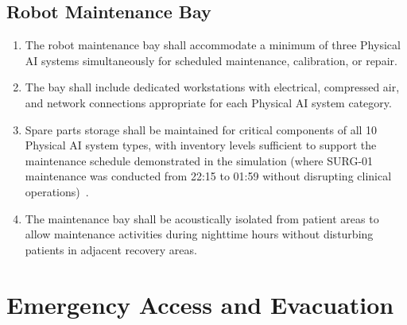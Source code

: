 \documentclass[11pt,letterpaper]{article}
\begin{document}
\subsection{Robot Maintenance Bay}

\begin{enumerate}[label=(\alph*)]
\item The robot maintenance bay shall accommodate a minimum of three Physical
  AI systems simultaneously for scheduled maintenance, calibration, or repair.

\item The bay shall include dedicated workstations with electrical, compressed
  air, and network connections appropriate for each Physical AI system
  category.

\item Spare parts storage shall be maintained for critical components of all
  10 Physical AI system types, with inventory levels sufficient to support
  the maintenance schedule demonstrated in the simulation (where SURG-01
  maintenance was conducted from 22:15 to 01:59 without disrupting clinical
  operations)~\cite{newtrial2026}.

\item The maintenance bay shall be acoustically isolated from patient areas to
  allow maintenance activities during nighttime hours without disturbing
  patients in adjacent recovery areas.
\end{enumerate}

\section{Emergency Access and Evacuation}
\end{document}
